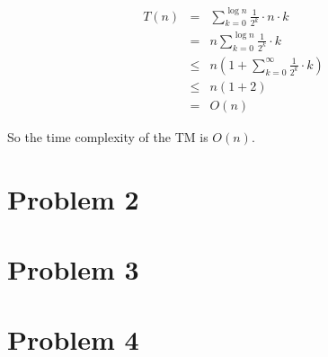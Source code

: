 \documentclass[12pt]{article}
\begin{document}
\begin{eqnarray}
  T(n) &=&    \sum_{k = 0}^{\log n} {\frac {1}{2^k} \cdot n \cdot k}
              \nonumber \\
       &=&  n \sum_{k = 0}^{\log n} {\frac {1}{2^k} \cdot k} 
              \nonumber \\
       &\leq& n (1 + \sum_{k = 0}^{\infty} {\frac {1}{2^k} \cdot k}) 
              \nonumber \\
       &\leq& n (1 + 2) \nonumber \\
       &=&    O(n)
\end{eqnarray}

So the time complexity of the TM is $O(n)$.

\section{Problem 2}

\section{Problem 3}

\section{Problem 4}


\appendix
\appendixpage
\addappheadtotoc
\end{document}
